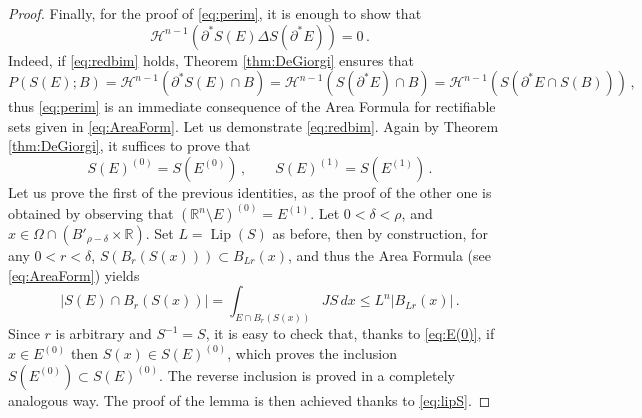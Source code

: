 \documentclass[a4paper,reqno,11pt]{amsart}
\newcommand{\R}{\mathbb{R}}
\newcommand{\Hau}{{\mathcal H}} %
\newcommand{\de}{\partial}
\newcommand{\difsim}{\Delta}
\newcommand{\Lip}{\mathop{\mathrm{Lip}}}
\newcommand{\p}{P}
\begin{document}
\begin{proof}
Finally, for the proof of \eqref{eq:perim}, it is enough to show that
\begin{equation} \label{eq:redbim}
\Hau^{n-1}(\de^\ast S(E) \difsim S(\de^\ast E)) = 0 \, .
\end{equation}
Indeed, if \eqref{eq:redbim} holds, Theorem \ref{thm:DeGiorgi} ensures that
\begin{equation*}
\p(S(E);B) = \Hau^{n-1}(\de^\ast S(E) \cap B) = \Hau^{n-1}(S(\de^\ast E) \cap B) = \Hau^{n-1}(S(\de^\ast E \cap S(B))) \, ,
\end{equation*}
thus \eqref{eq:perim} is an immediate consequence of the Area Formula for rectifiable sets given in \eqref{eq:AreaForm}. Let us demonstrate \eqref{eq:redbim}. Again by Theorem \ref{thm:DeGiorgi}, it suffices to prove that
\begin{equation*} %
S(E)^{(0)} = S(E^{(0)}) \, , \qquad S(E)^{(1)} = S(E^{(1)}) \, .
\end{equation*}
Let us prove the first of the previous identities, as the proof of the other one is obtained by observing that $(\R^{n}\setminus E)^{(0)} = E^{(1)}$. Let $0<\delta <\rho$, and $x \in \Omega \cap (B'_{\rho - \delta} \times \R)$. Set $L=\Lip(S)$ as before, then by construction, for any $0 < r < \delta$, $S(B_{r}(S(x))) \subset B_{L r}(x)$, and thus the Area Formula (see \eqref{eq:AreaForm}) yields
\begin{equation} \label{eq:E(0)}
|S(E) \cap B_{r}(S(x))| = \int_{E \cap B_{r}(S(x))} J S\, dx \leq L^{n} |B_{L r}(x)| \, . 
\end{equation}
Since $r$ is arbitrary and $S^{-1}=S$, it is easy to check that, thanks to \eqref{eq:E(0)}, if $x \in E^{(0)}$ then $S(x) \in S(E)^{(0)}$, which proves the inclusion $S(E^{(0)})\subset S(E)^{(0)}$. The reverse inclusion is proved in a completely analogous way. The proof of the lemma is then achieved thanks to \eqref{eq:lipS}.
\end{proof}

	
\end{document}
